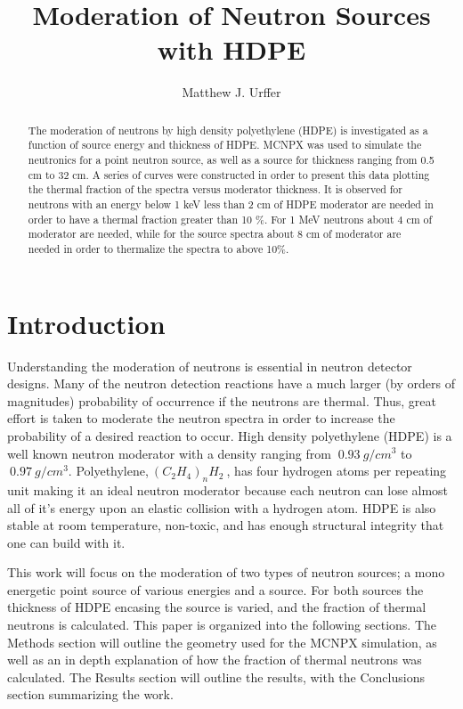 \documentclass[draftcls,onecolumn]{IEEEtran}
\begin{document}
\title{Moderation of Neutron Sources with HDPE}
\author{Matthew J. Urffer}

\maketitle
\begin{abstract}
The moderation of neutrons by high density polyethylene (HDPE) is investigated as a function of source energy and thickness of HDPE.
MCNPX was used to simulate the neutronics for a point neutron source, as well as a  source for thickness ranging from 0.5 cm to 32 cm.
A series of curves were constructed in order to present this data plotting the thermal fraction of the spectra versus moderator thickness.
It is observed for neutrons with an energy below 1 keV less than 2 cm of HDPE moderator are needed in order to have a thermal fraction greater than 10 \%.  
For 1 MeV neutrons about 4 cm of moderator are needed, while for the  source spectra about 8 cm of moderator are needed in order to thermalize the spectra to above 10\%.
\end{abstract}

\IEEEpeerreviewmaketitle

\pagebreak
\tableofcontents
\listoftodos
\listoffigures
\listoftables
\lstlistoflistings
\pagebreak

\section{Introduction}
Understanding the moderation of neutrons is essential in neutron detector designs.
Many of the neutron detection reactions have a much larger (by orders of magnitudes) probability of occurrence if the neutrons are thermal.
Thus, great effort is taken to moderate the neutron spectra in order to increase the probability of a desired reaction to occur.
High density polyethylene (HDPE) is a well known neutron moderator with a density ranging from $~0.93~g/cm^3$ to $~0.97~ g/cm^3$.
Polyethylene,$~\left (C_2 H_4\right )_n H_2~$, has four hydrogen atoms per repeating unit making it an ideal neutron moderator because each neutron can lose almost all of it's energy upon an elastic collision with a hydrogen atom.
HDPE is also stable at room temperature, non-toxic, and has enough structural integrity that one can build with it.

This work will focus on the moderation of two types of neutron sources; a mono energetic point source of various energies and a  source.
For both sources the thickness of HDPE encasing the source is varied, and the fraction of thermal neutrons is calculated.
This paper is organized into the following sections.  The Methods section will outline the geometry used for the MCNPX simulation, as well as an in depth explanation of how the fraction of thermal neutrons was calculated.  The Results section will outline the   results, with the Conclusions section summarizing the work.
\end{document}
